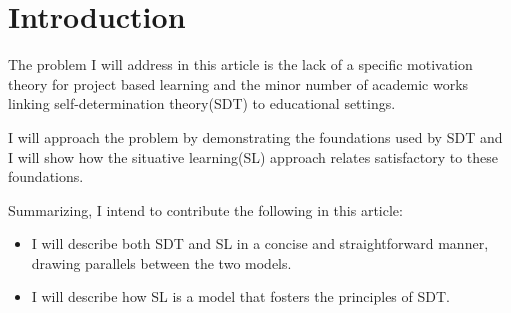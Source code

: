 \section{Introduction}

The problem I will address in this article is the lack of a specific motivation
theory for project based learning and the minor number of academic works linking
self-determination theory(SDT) to educational settings.

I will approach the problem by demonstrating the foundations used by SDT and I
will show how the situative learning(SL) approach relates satisfactory to these
foundations. 

Summarizing, I intend to contribute the following in this article:

\begin{itemize}
 
    \item I will describe both SDT and SL in a concise and
    straightforward manner, drawing parallels between the two models.

    \item I will describe how SL is a model that fosters the
    principles of SDT.

\end{itemize}

